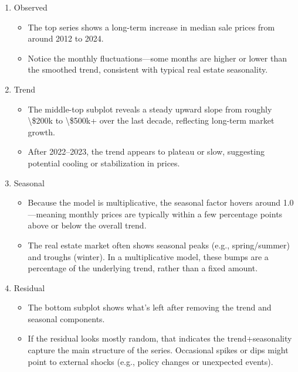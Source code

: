 \documentclass[11pt]{article}
\providecommand{\tightlist}{%
      \setlength{\itemsep}{0pt}\setlength{\parskip}{0pt}}
\begin{document}
\begin{enumerate}
\def\labelenumi{\arabic{enumi}.}
\tightlist
\item
  Observed

  \begin{itemize}
  \tightlist
  \item
    The top series shows a long-term increase in median sale prices from
    around 2012 to 2024.
  \item
    Notice the monthly fluctuations---some months are higher or lower
    than the smoothed trend, consistent with typical real estate
    seasonality.
  \end{itemize}
\item
  Trend

  \begin{itemize}
  \tightlist
  \item
    The middle-top subplot reveals a steady upward slope from roughly
    \textbackslash\$200k to \textbackslash\$500k+ over the last decade,
    reflecting long-term market growth.
  \item
    After 2022--2023, the trend appears to plateau or slow, suggesting
    potential cooling or stabilization in prices.
  \end{itemize}
\item
  Seasonal

  \begin{itemize}
  \tightlist
  \item
    Because the model is multiplicative, the seasonal factor hovers
    around 1.0---meaning monthly prices are typically within a few
    percentage points above or below the overall trend.
  \item
    The real estate market often shows seasonal peaks (e.g.,
    spring/summer) and troughs (winter). In a multiplicative model,
    these bumps are a percentage of the underlying trend, rather than a
    fixed amount.
  \end{itemize}
\item
  Residual

  \begin{itemize}
  \tightlist
  \item
    The bottom subplot shows what's left after removing the trend and
    seasonal components.
  \item
    If the residual looks mostly random, that indicates the
    trend+seasonality capture the main structure of the series.
    Occasional spikes or dips might point to external shocks (e.g.,
    policy changes or unexpected events).
  \end{itemize}
\end{enumerate}
\end{document}
